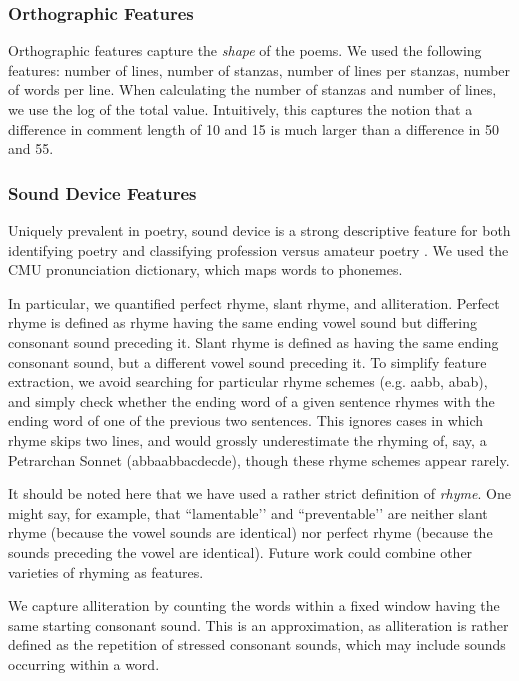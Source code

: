 \documentclass[11pt]{article}
\begin{document}
\subsubsection{Orthographic Features}
Orthographic features capture the \emph{shape} of the poems. We used the following features: number of lines, number of stanzas, number of lines per stanzas, number of words per line. When calculating the number of stanzas and number of lines, we use the log of the total value. Intuitively, this captures the notion that a difference in comment length of 10 and 15 is much larger than a difference in 50 and 55.

\subsubsection{Sound Device Features}
Uniquely prevalent in poetry, sound device is a strong descriptive feature for both identifying poetry \cite{tizhoosh2008poetic} and classifying profession versus amateur poetry \cite{kao2012computational}. We used the CMU pronunciation dictionary, which maps words to phonemes.

In particular, we quantified perfect rhyme, slant rhyme, and alliteration. Perfect rhyme is defined as rhyme having the same ending vowel sound but differing consonant sound preceding it. Slant rhyme is defined as having the same ending consonant sound, but a different vowel sound preceding it. To simplify feature extraction, we avoid searching for particular rhyme schemes (e.g. aabb, abab), and simply check whether the ending word of a given sentence rhymes with the ending word of one of the previous two sentences. This ignores cases in which rhyme skips two lines, and would grossly underestimate the rhyming of, say, a Petrarchan Sonnet (abbaabbacdecde), though these rhyme schemes appear rarely.

It should be noted here that we have used a rather strict definition of \emph{rhyme}. One might say, for example, that ``lamentable’’ and ``preventable’’ are neither slant rhyme (because the vowel sounds are identical) nor perfect rhyme (because the sounds preceding the vowel are identical). Future work could combine other varieties of rhyming as features.

We capture alliteration by counting the words within a fixed window having the same starting consonant sound. This is an approximation, as alliteration is rather defined as the repetition of stressed consonant sounds, which may include sounds occurring within a word.
\end{document}
